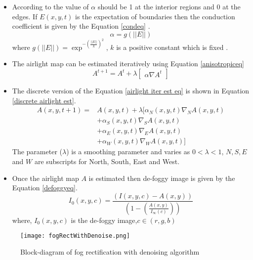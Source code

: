 \begin{itemize}
\item According to \cite{fog removal} the value of $\alpha$ should be 1 at the interior regions and 0 at the edges. If $E(x,y,t)$ is the expectation of boundaries then the conduction coefficient is given by the Equation \ref{condeq} \cite{anisotropic}.
\begin{equation}\label{condeq}
\alpha=g(|| E ||)
\end{equation}   
where $g(|| E ||)=\exp^{-(\frac{||E||}{k})^2}$, $k$ is a positive constant which is fixed \cite{fog removal}.
\item The airlight map can be estimated iteratively using Equation \ref{anisotropiceq} \cite{anisotropic}
\begin{equation}\label{airlight iter est eq}
A^{t+1}=A^t+\lambda \begin{bmatrix}
\alpha \nabla A^t
\end{bmatrix}
\end{equation}
\item The discrete version of the Equation \ref{airlight iter est eq} is shown in Equation \ref{discrete airlight est}.
\begin{equation}\label{discrete airlight est}
\begin{split}
A(x,y,t+1) = & A(x,y,t) + \lambda 
[\alpha_N(x,y,t) \nabla_N A(x,y,t) \\&+ \alpha_S(x,y,t) \nabla_S A(x,y,t) \\&+ \alpha_E(x,y,t) \nabla_E A(x,y,t) \\ &+ \alpha_W(x,y,t) \nabla_W A(x,y,t)]
\end{split}
\end{equation}
The parameter ($\lambda$) is a smoothing parameter and varies as $0<\lambda<1$, $N,S,E$ and $ W$ are subscripts for North, South, East and West.
		\item Once the airlight map $A$ is estimated then de-foggy image is given by the Equation \ref{defoggyeq}.
		\begin{equation}\label{defoggyeq}
		I_0(x,y,c)=\frac{(I(x,y,c)-A(x,y))}{(1-(\frac{A(x,y)}{I_\infty(c)}))}
		\end{equation}
		where, $I_0(x,y,c)$ is the de-foggy image,$c\in (r,g,b)$
\end{itemize}
\begin{figure}[h!]
	\centering
	\texttt{[image: fogRectWithDenoise.png]}
	\caption{Block-diagram of fog rectification with denoising algorithm}
	\label{fig:fog rectification algorithm}
\end{figure}

